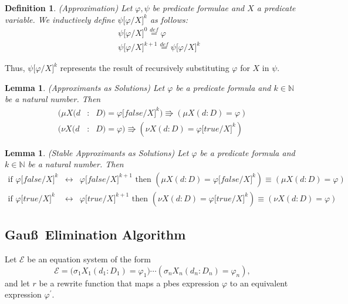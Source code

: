 \documentclass{article}
\newtheorem{definition}[theorem]{Definition}
\newtheorem{lemma}[theorem]{Lemma}
\begin{document}
\begin{definition}
(Approximation) Let $\varphi ,\psi $ be predicate formulae and $X$ a
predicate variable. We inductively define $\psi \lbrack \varphi /X]^{k}$ as
follows:%
\begin{eqnarray*}
&&\psi \lbrack \varphi /X]^{0}\overset{def}{=}\varphi \\
&&\psi \lbrack \varphi /X]^{k+1}\overset{def}{=}\psi \lbrack \varphi /X]^{k}
\end{eqnarray*}
\end{definition}

Thus, $\psi \lbrack \varphi /X]^{k}$ represents the result of recursively
substituting $\varphi $ for $X$ in $\psi $.

\begin{lemma}
(Approximants as Solutions) Let $\varphi $ be a predicate formula and $k\in 
\mathbb{N}$ be a natural number. Then%
\begin{eqnarray*}
(\mu X(d &:&D)=\varphi \lbrack false /X]^{k})\Rrightarrow (\mu
X(d:D)=\varphi ) \\
(\nu X(d &:&D)=\varphi )\Rrightarrow (\nu X(d:D)=\varphi \lbrack true
/X]^{k})
\end{eqnarray*}
\end{lemma}

\begin{lemma}
(Stable Approximants as Solutions) Let $\varphi $ be a predicate formula and 
$k\in \mathbb{N}$ be a natural number. Then%
\begin{eqnarray*}
\text{if }\varphi \lbrack false/X]^{k} &\longleftrightarrow &\varphi \lbrack
false/X]^{k+1}\text{ then }(\mu X(d:D)=\varphi \lbrack false/X]^{k})\equiv
(\mu X(d:D)=\varphi ) \\
\text{if }\varphi \lbrack true/X]^{k} &\longleftrightarrow &\varphi \lbrack
true/X]^{k+1}\text{ then }(\nu X(d:D)=\varphi \lbrack true/X]^{k})\equiv
(\nu X(d:D)=\varphi )
\end{eqnarray*}
\end{lemma}

\subsection{Gau\ss\ Elimination Algorithm}

Let $\mathcal{E}$ be an equation system of the form%
\begin{equation*}
\mathcal{E=(}\sigma _{1}X_{1}(d_{1}:D_{1})=\varphi _{1})\cdots (\sigma
_{n}X_{n}(d_{n}:D_{n})=\varphi _{n}),
\end{equation*}%
and let $r$ be a rewrite function that maps a pbes expression $\varphi $ to
an equivalent expression $\varphi ^{\prime }$.
\end{document}
